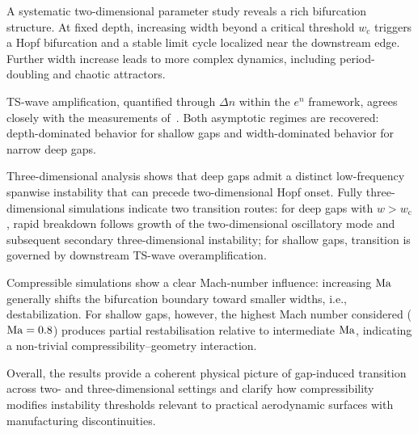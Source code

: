 \documentclass[twocolumn,10pt]{tsfp}
\begin{document}
A systematic two-dimensional parameter study reveals a rich bifurcation structure. At fixed depth, increasing width beyond a critical threshold $w_\text{c}$ triggers a Hopf bifurcation and a stable limit cycle localized near the downstream edge. Further width increase leads to more complex dynamics, including period-doubling and chaotic attractors.

TS-wave amplification, quantified through $\Delta n$ within the $e^n$ framework, agrees closely with the measurements of~\cite{jeffGaps}. Both asymptotic regimes are recovered: depth-dominated behavior for shallow gaps and width-dominated behavior for narrow deep gaps.

Three-dimensional analysis shows that deep gaps admit a distinct low-frequency spanwise instability that can precede two-dimensional Hopf onset. Fully three-dimensional simulations indicate two transition routes: for deep gaps with $w>w_\text{c}$, rapid breakdown follows growth of the two-dimensional oscillatory mode and subsequent secondary three-dimensional instability; for shallow gaps, transition is governed by downstream TS-wave overamplification.

Compressible simulations show a clear Mach-number influence: increasing $\mathrm{Ma}$ generally shifts the bifurcation boundary toward smaller widths, i.e., destabilization. For shallow gaps, however, the highest Mach number considered ($\mathrm{Ma}=0.8$) produces partial restabilisation relative to intermediate $\mathrm{Ma}$, indicating a non-trivial compressibility--geometry interaction.

Overall, the results provide a coherent physical picture of gap-induced transition across two- and three-dimensional settings and clarify how compressibility modifies instability thresholds relevant to practical aerodynamic surfaces with manufacturing discontinuities.



\end{document}
